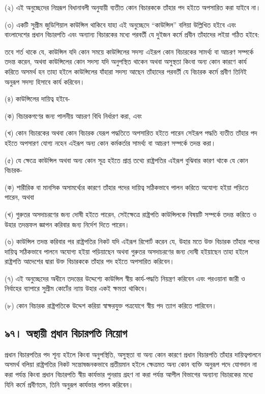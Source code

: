 \documentclass[11pt]{article}
\begin{document}
(২) এই অনুচ্ছেদের নিম্নরূপ বিধানাবলী অনুযায়ী ব্যতীত কোন বিচারককে তাঁহার পদ
    হইতে অপসারিত করা যাইবে না।

(৩) একটি সুপ্রীম জুডিশিয়াল কাউন্সিল থাকিবে যাহা এই অনুচ্ছেদে “কাউন্সিল” বলিয়া
    উল্লিখিত হইবে এবং বাংলাদেশের প্রধান বিচারপতি এবং অন্যান্য বিচারকের মধ্যে
    পরবর্তী যে দুইজন কর্মে প্রবীন তাঁহাদের লইয়া গঠিত হইবে:

তবে শর্ত থাকে যে, কাউন্সিল যদি কোন সময়ে কাউন্সিলের সদস্য এইরূপ কোন বিচারকের
সামর্থ্য বা আচরণ সম্পর্কে তদন্ত করেন, অথবা কাউন্সিলের কোন সদস্য যদি অনুপস্থিত
থাকেন অথবা অসুস্থতা কিংবা অন্য কোন কারণে কার্য করিতে অসমর্থ হন তাহা হইলে
কাউন্সিলের যাঁহারা সদস্য আছেন তাঁহাদের পরবর্তী যে বিচারক কর্মে প্রবীণ তিনিই
অনুরূপ সদস্য হিসাবে কার্য করিবেন।

(৪) কাউন্সিলের দায়িত্ব হইবে-

(ক) বিচারকগণের জন্য পালনীয় আচরণ বিধি নির্ধারণ করা, এবং

(খ) কোন বিচারকের অথবা কোন বিচারক যেরূপ পদ্ধতিতে অপসারিত হইতে পারেন সেইরূপ
    পদ্ধতি ব্যতীত তাঁহার পদ হইতে অপসারণ যোগ্য নহেন এইরূপ অন্য কোন কর্মকর্তার
    সামর্থ্য বা আচরণ সম্পর্কে তদন্ত করা।

(৫) যে ক্ষেত্রে কাউন্সিল অথবা অন্য কোন সূত্র হইতে প্রাপ্ত তথ্যে রাষ্ট্রপতির এইরূপ
    বুঝিবার কারণ থাকে যে কোন বিচারক-

(ক) শারীরিক বা মানসিক অসামর্থ্যের কারণে তাঁহার পদের দায়িত্ব সঠিকভাবে পালন
    করিতে অযোগ্য হইয়া পড়িতে পারেন, অথবা

(খ) গুরুতর অসদাচরণের জন্য দোষী হইতে পারেন, সেইক্ষেত্রে রাষ্ট্রপতি কাউন্সিলকে
    বিষয়টি সম্পর্কে তদন্ত করিতে ও উহার তদন্তফল জ্ঞাপন করিবার জন্য নির্দেশ দিতে
    পারেন।

(৬) কাউন্সিল তদন্ত করিবার পর রাষ্ট্রপতির নিকট যদি এইরূপ রিপোর্ট করেন যে,
    উহার মতে উক্ত বিচারক তাঁহার পদের দায়িত্ব সঠিকভাবে পালনে অযোগ্য হইয়া
    পড়িয়াছেন অথবা গুরুতর অসদাচরণের জন্য দোষী হইয়াছেন তাহা হইলে রাষ্ট্রপতি
    আদেশের দ্বারা উক্ত বিচারককে তাঁহার পদ হইতে অপসারিত করিবেন।

(৭) এই অনুচ্ছেদের অধীনে তদন্তের উদ্দেশ্যে কাউন্সিল স্বীয় কার্য-পদ্ধতি নিয়ন্ত্রণ
    করিবেন এবং পরওয়ানা জারী ও নির্বাহের ব্যাপারে সুপ্রীম কোর্টের ন্যায় উহার একই
    ক্ষমতা থাকিবে।

(৮) কোন বিচারক রাষ্ট্রপতিকে উদ্দেশ করিয়া স্বাক্ষরযুক্ত পত্রযোগে স্বীয় পদ ত্যাগ
    করিতে পারিবেন।

\subsection{৯৭। অস্থায়ী প্রধান বিচারপতি নিয়োগ}
\label{sec:orgcec0b3c}
প্রধান বিচারপতির পদ শূন্য হইলে কিংবা অনুপস্থিতি, অসুস্থতা বা অন্য কোন কারণে
প্রধান বিচারপতি তাঁহার দায়িত্বপালনে অসমর্থ বলিয়া রাষ্ট্রপতির নিকট
সন্তোষজনকভাবে প্রতীয়মান হইলে ক্ষেত্রমত অন্য কোন ব্যক্তি অনুরূপ পদে যোগদান না
করা পর্যন্ত কিংবা প্রধান বিচারপতি স্বীয় কার্যভার পুনরায় গ্রহণ না করা পর্যন্ত
আপীল বিভাগের অন্যান্য বিচারকের মধ্যে যিনি কর্মে প্রবীণতম, তিনি অনুরূপ
কার্যভার পালন করিবেন।
\end{document}
